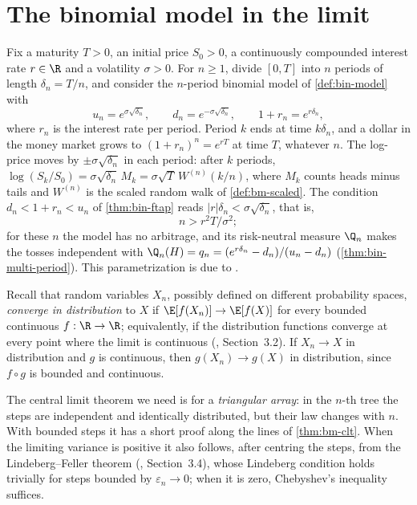 \section{The binomial model in the limit}\label{sec:bs-limit}

Fix a maturity $T>0$, an initial price $S_0>0$, a continuously compounded interest rate
$r\in\R$ and a volatility $\sigma>0$. For $n\ge1$, divide $[0,T]$ into $n$ periods of
length $\delta_n=T/n$, and consider the $n$-period binomial model of \cref{def:bin-model}
with
\begin{equation}\label{eq:bs-crr}
  u_n=e^{\sigma\sqrt{\delta_n}},\qquad d_n=e^{-\sigma\sqrt{\delta_n}},\qquad
  1+r_n=e^{r\delta_n},
\end{equation}
where $r_n$ is the interest rate per period. Period $k$ ends at time $k\delta_n$, and a
dollar in the money market grows to $(1+r_n)^n=e^{rT}$ at time $T$, whatever $n$. The
log-price moves by $\pm\sigma\sqrt{\delta_n}$ in each period: after $k$ periods,
$\log(S_k/S_0)=\sigma\sqrt{\delta_n}\,M_k=\sigma\sqrt T\,W^{(n)}(k/n)$, where $M_k$ counts
heads minus tails and $W^{(n)}$ is the scaled random walk of \cref{def:bm-scaled}. The
condition $d_n<1+r_n<u_n$ of \cref{thm:bin-ftap} reads $|r|\delta_n<\sigma\sqrt{\delta_n}$,
that is,
\[
  n>r^2T/\sigma^2 ;
\]
for these $n$ the model has no arbitrage, and its risk-neutral measure $\Q_n$ makes the
tosses independent with $\Q_n(H)=q_n=(e^{r\delta_n}-d_n)/(u_n-d_n)$
(\cref{thm:bin-multi-period}). This parametrization is due to \textcite{crr1979}.

Recall that random variables $X_n$, possibly defined on different probability spaces,
\emph{converge in distribution} to $X$ if $\E[f(X_n)]\to\E[f(X)]$ for every bounded
continuous $f:\R\to\R$; equivalently, if the distribution functions converge at every
point where the limit is continuous (\textcite{durrett}, Section~3.2). If $X_n\to X$ in
distribution and $g$ is continuous, then $g(X_n)\to g(X)$ in distribution, since
$f\circ g$ is bounded and continuous.

The central limit theorem we need is for a \emph{triangular array}: in the $n$-th tree
the steps are independent and identically distributed, but their law changes with $n$.
With bounded steps it has a short proof along the lines of \cref{thm:bm-clt}. When the
limiting variance is positive it also follows, after centring the steps, from the
Lindeberg--Feller theorem (\textcite{durrett}, Section~3.4), whose Lindeberg condition holds
trivially for steps bounded by $\varepsilon_n\to0$; when it is zero, Chebyshev's inequality
suffices.

